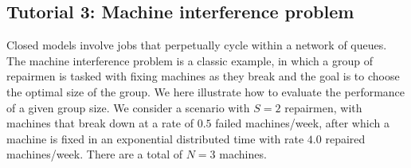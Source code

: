 \subsection{Tutorial 3: Machine interference problem}
\label{example-3-machine-interference-problem}
Closed models involve jobs that perpetually cycle within a network of queues. The machine interference problem is a classic example, in which a group of repairmen is tasked with fixing machines as they break and the goal is to choose the optimal size of the group. We here illustrate how to evaluate the performance of a given group size. We consider a scenario with $S=2$ repairmen, with machines that break down at a rate of $0.5$ failed machines/week, after which a machine is fixed in an exponential distributed time with rate $4.0$ repaired machines/week. There are a total of $N=3$ machines.

